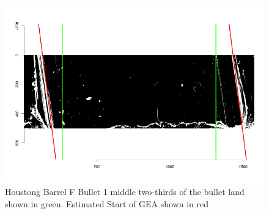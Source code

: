 \documentclass[12pt]{article}
\theoremstyle{nonumberplain}
\begin{document}
\begin{figure}[!ht]
  \centering
  \includegraphics[width = .9\textwidth]{../images/Hamby_252_Bullet1_Land3_BestFit}
  \caption{Houstong Barrel F Bullet 1 middle two-thirds of the bullet land shown in green. Estimated Start of GEA shown in red}
  \label{fig: bestfit1}
\end{figure}

 
\end{document}
